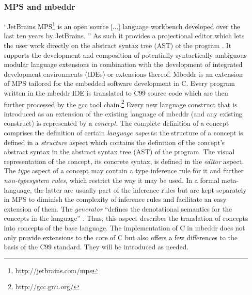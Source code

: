 \subsubsection{MPS and mbeddr}
``JetBrains MPS\footnote{http://jetbrains.com/mps} is an open source [...] language workbench developed over the last ten years by JetBrains. '' \cite{GenericTools_SpecificLanguages} As such it provides a projectional editor which lets the user work directly on the abstract syntax tree (AST) of the program \cite{LanguageWorkbenches}. It supports the development and composition of potentially syntactically ambiguous modular language extensions in combination with the development of integrated development environments (IDEs) or extensions thereof. Mbeddr is an extension of MPS tailored for the embedded software development in C. Every program written in the mbeddr IDE is translated to C99 source code which are then further processed by the gcc tool chain.\footnote{http://gcc.gnu.org/} Every new language construct that is introduced as an extension of the existing language of mbeddr (and any existing construct) is represented by a \textit{concept}. The complete definition of a concept comprises the definition of certain \textit{language aspects}: the structure of a concept is defined in a \textit{structure} aspect which contains the definition of the concept's abstract syntax in the abstract syntax tree (AST) of the program. The visual representation of the concept, its concrete syntax, is defined in the \textit{editor} aspect. The \textit{type} aspect of a concept may contain a type inference rule for it and further \textit{non-typesystem rules}, which restrict the way it may be used. In a formal meta-language, the latter are usually part of the inference rules but are kept separately in MPS to diminish the complexity of inference rules and facilitate an easy extension of them. The \textit{generator} ``defines the denotational semantics for the concepts in the language'' \cite{GeneratorUserGuide}. Thus, this aspect describes the translation of concepts into concepts of the base language.
The implementation of C in mbeddr does not only provide extensions to the core of C but also offers a few differences to the basis of the C99 standard. They will be introduced as needed.


